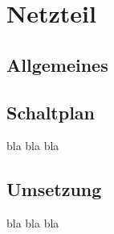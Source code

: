 \chapter{Netzteil}
\label{ch:Netzteil}
\section{Allgemeines}


\section{Schaltplan}
bla bla bla

\section{Umsetzung}
bla bla bla